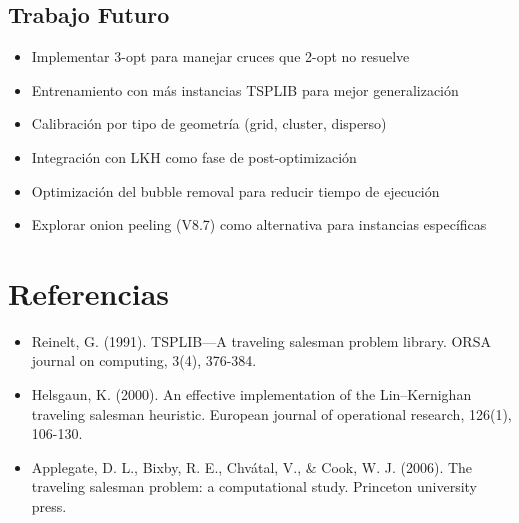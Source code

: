 \documentclass[12pt, a4paper]{article}
\begin{document}
\subsection{Trabajo Futuro}

\begin{itemize}
    \item Implementar 3-opt para manejar cruces que 2-opt no resuelve
    \item Entrenamiento con más instancias TSPLIB para mejor generalización
    \item Calibración por tipo de geometría (grid, cluster, disperso)
    \item Integración con LKH como fase de post-optimización
    \item Optimización del bubble removal para reducir tiempo de ejecución
    \item Explorar onion peeling (V8.7) como alternativa para instancias específicas
\end{itemize}

\section{Referencias}

\begin{itemize}
    \item Reinelt, G. (1991). TSPLIB---A traveling salesman problem library. ORSA journal on computing, 3(4), 376-384.
    \item Helsgaun, K. (2000). An effective implementation of the Lin--Kernighan traveling salesman heuristic. European journal of operational research, 126(1), 106-130.
    \item Applegate, D. L., Bixby, R. E., Chvátal, V., \& Cook, W. J. (2006). The traveling salesman problem: a computational study. Princeton university press.
\end{itemize}
\end{document}
